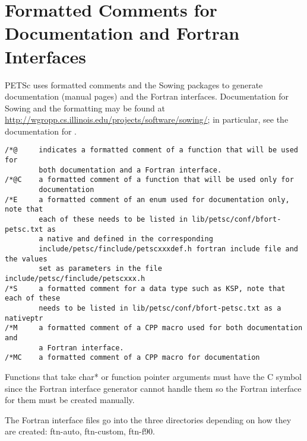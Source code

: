 \documentclass[twoside,12pt]{../sty/report_petsc}
\begin{document}
\section{Formatted Comments for Documentation and Fortran Interfaces}

PETSc uses formatted comments and the Sowing packages to generate documentation (manual pages) and the Fortran interfaces. 
Documentation for Sowing and the formatting may be found at \href{http://wgropp.cs.illinois.edu/projects/software/sowing/}{http://wgropp.cs.illinois.edu/projects/software/sowing/}; in particular, see the documentation for .

\begin{verbatim}
/*@     indicates a formatted comment of a function that will be used for
        both documentation and a Fortran interface.
/*@C    a formatted comment of a function that will be used only for
        documentation
/*E     a formatted comment of an enum used for documentation only, note that
        each of these needs to be listed in lib/petsc/conf/bfort-petsc.txt as
        a native and defined in the corresponding
        include/petsc/finclude/petscxxxdef.h fortran include file and the values
        set as parameters in the file include/petsc/finclude/petscxxx.h
/*S     a formatted comment for a data type such as KSP, note that each of these
        needs to be listed in lib/petsc/conf/bfort-petsc.txt as a nativeptr
/*M     a formatted comment of a CPP macro used for both documentation and
        a Fortran interface.
/*MC    a formatted comment of a CPP macro for documentation
\end{verbatim}

Functions that take char* or function pointer arguments must have the C symbol since the Fortran interface generator cannot handle them so the Fortran interface for them must be created manually.

The Fortran interface files go into the three directories depending on how they are created: ftn-auto, ftn-custom, ftn-f90.
\end{document}
